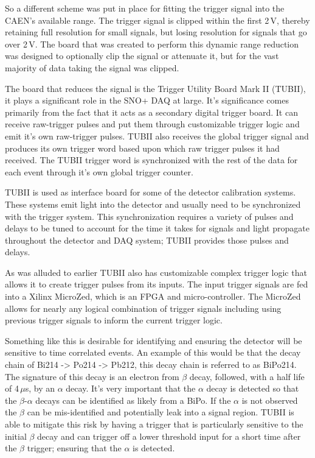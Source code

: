 So a different scheme was put in place for fitting the trigger signal
into the CAEN's available range. The trigger signal is clipped within
the first 2\,V, thereby retaining full resolution for small signals,
but losing resolution for signals that go over 2\,V.
The board that was created to perform this dynamic range reduction
was designed to optionally clip the signal or attenuate it, but
for the vast majority of data taking the signal was clipped.

The board that reduces the signal is the Trigger Utility Board Mark II (TUBII),
it plays a significant role in the SNO+ DAQ at large.
It's significance comes primarily from the fact that it acts as a secondary
digital trigger board. It can receive raw-trigger pulses and put them
through customizable trigger logic and emit it's own raw-trigger pulses.
TUBII also receives the global trigger signal and produces its own trigger
word based upon which raw trigger pulses it had received. The TUBII trigger
word is synchronized with the rest of the data for each event through it's own
global trigger counter.

TUBII is used as interface board for some of the detector calibration systems.
These systems emit light into the detector and usually need to be
synchronized with the trigger system. This synchronization requires
a variety of pulses and delays to be tuned to account for the time it
takes for signals and light propagate throughout the detector and DAQ
system; TUBII provides those pulses and delays.

As was alluded to earlier TUBII also has customizable complex trigger logic that
allows it to create trigger pulses from its inputs.
The input trigger signals are fed into a Xilinx MicroZed, which is an FPGA and
micro-controller.
The MicroZed allows for nearly any logical combination of trigger signals including
using previous trigger signals to inform the current trigger logic.

Something like this is desirable for identifying and ensuring the detector will
be sensitive to time correlated events. An example of this would be that
the decay chain of Bi214 -> Po214 -> Pb212, this decay chain is referred to as BiPo214. %
The signature of this decay is an electron from $\beta$ decay, followed, with a half
life of 4\,$\mu$s, by an $\alpha$ decay.
It's very important that the $\alpha$ decay is detected so that the $\beta$-$\alpha$
decays can be identified as likely from a BiPo. If the $\alpha$ is not observed
the $\beta$ can be mis-identified and potentially leak into a signal region.
TUBII is able to mitigate this risk by having a trigger that is particularly
sensitive to the initial $\beta$ decay and can trigger off a lower
threshold input for a short time after the $\beta$ trigger; ensuring that
the $\alpha$ is detected.

